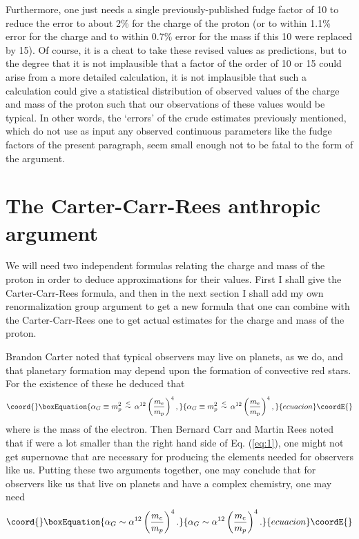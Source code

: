 \documentclass[a4paper,12pt]{article}
\begin{document}
	Furthermore, one just needs a single previously-published fudge
factor of 10 to reduce the error to about 2\% for the charge of the proton
(or to within 1.1\% error for the charge
and to within 0.7\% error for the mass if this 10 were replaced by 15).
Of course, it is a cheat
to take these revised values as predictions,
but to the degree that it is not implausible that a factor
of the order of 10 or 15 could arise from a more detailed calculation,
it is not implausible that such a calculation could give
a statistical distribution of observed values of the
charge and mass of the proton
such that our observations of these values would be typical.
In other words, the `errors' of the crude estimates
previously mentioned,
which do not use as input any observed continuous parameters
like the fudge factors of the present paragraph,
seem small enough not to be fatal to the form of the argument. 

\section{The Carter-Carr-Rees anthropic argument}

	We will need two independent formulas relating
the charge and mass of the proton in order to deduce
approximations for their values.  First I shall give
the Carter-Carr-Rees formula,
and then in the next section I shall add my own renormalization
group argument to get a new formula that one can combine
with the Carter-Carr-Rees one to get actual estimates
for the charge and mass of the proton.

	Brandon Carter \cite{Carter} noted that typical observers
may live on planets, as we do, and that planetary formation
may depend upon the formation of convective red stars.
For the existence of these he deduced that
 \begin{equation}\coord{}\boxEquation{
 \alpha_G \equiv m_p^2 \, \stackrel{<}{\sim} \,
  \alpha^{12}\left({m_e\over m_p}\right)^4,
 \label{eq:1}
 }{
 \alpha_G \equiv m_p^2 \, \stackrel{<}{\sim} \,
  \alpha^{12}\left({m_e\over m_p}\right)^4,
 }{ecuacion}\coordE{}\end{equation}
where \coordHE{} is the mass of the electron.
Then Bernard Carr and Martin Rees \cite{Carr-Rees}
noted that if \coordHE{} were a lot smaller than the
right hand side of Eq. (\ref{eq:1}),
one might not get supernovae that are necessary
for producing the elements needed for observers like us.
Putting these two arguments together,
one may conclude that for observers like us
that live on planets and have a complex chemistry,
one may need
 \begin{equation}\coord{}\boxEquation{
 \alpha_G \sim \alpha^{12}\left({m_e\over m_p}\right)^4.
 \label{eq:2}
 }{
 \alpha_G \sim \alpha^{12}\left({m_e\over m_p}\right)^4.
 }{ecuacion}\coordE{}\end{equation}
 
\end{document}
